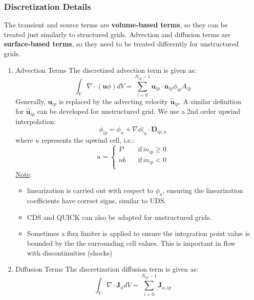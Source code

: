 \documentclass[11pt]{article}
\begin{document}
\subsubsection{Discretization Details}
\label{sec:orgbdc4fd3}
The transient and source terms are \textbf{volume-based terms}, so they can be treated just similarly to structured
grids. Advection and diffusion terms are \textbf{surface-based terms}, so they need to be treated differently
for unstructured grids.
\begin{enumerate}
\item Advection Terms
\label{sec:org4dc92a6}
The discretized advection term is given as:
\begin{equation*}
\int_{V} \nabla \cdot (\textbf{u}\phi)dV = \sum_{i=0}^{N_{ip}-1} \textbf{u}_{ip}
\cdot \textbf{n}_{ip} \phi_{ip} A_{ip}
\end{equation*}
Generally, \(\textbf{u}_{ip}\) is replaced by the advecting velocity \(\hat{\textbf{u}}_{ip}\).
A similar definition for \(\hat{\textbf{u}}_{ip}\) can be developed for unstructured grid. We use a 2nd order
upwind interpolation:
\begin{equation*}
\phi_{ip} = \phi_u + \nabla \phi \biggr\rvert_u \cdot \textbf{D}_{ip,u}
\end{equation*}
where \(u\) represents the upwind cell, i.e.:
\begin{equation*}
u=\begin{cases}
P \quad &\text{if} \, \dot{m}_{ip} \geq 0 \\
nb \quad &\text{if} \, \dot{m}_{ip} < 0  \\
\end{cases}
\end{equation*}
\uline{Note}:
\begin{itemize}
\item linearization is carried out with respect to \(\phi_u\), ensuring the linearization coefficients have
correct signs, similar to UDS.
\item CDS and QUICK can also be adapted for unstructured grids.
\item Sometimes a flux limiter is applied to ensure the integration point value is bounded by the
the surrounding cell values. This is important in flow with discontinuities (shocks)
\end{itemize}
\item Diffusion Terms
\label{sec:org63474da}
The discretization diffusion term is given as:
\begin{equation*}
\int_{V} \nabla \cdot \textbf{J}_\phi dV = \sum_{i = 0}^{N_{ip}-1} \textbf{J}_{\phi,ip}

\end{equation*}
\end{enumerate}
\end{document}
